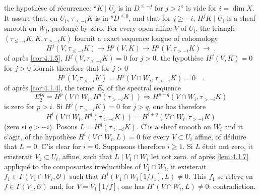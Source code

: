 \documentclass[12pt,a4paper]{article}
\theoremstyle{plain}
\theoremstyle{definition}
\newcommand{\cO}{\mathcal{O}}
\providecommand{\cO}{\mathcal{O}}
\begin{document}
the hypoth\`{e}se of r\'{e}currence: ``$K \mid U_{j}$ is in $D^{\leq -j}$ for $j > i$'' is vide for $i = \dim X$. It assure that, on $U_{i}$, $\tau_{\leq -i}K$ is in ${}^{p}D^{\leq 0}$, and that for $j \geq -i$, $H^{j}K \mid U_{i}$ is a sheaf smooth on $W_{i}$, prolong\'{e} by z\'{e}ro. For every open affine $V$ of $U_{i}$, the triangle $(\tau_{\leq -i}K, K, \tau_{> -i}K)$ fournit a exact sequence longue of cohomology
\[
H^{j}(V, \tau_{\leq -i}K) \longrightarrow H^{j}(V,K) \longrightarrow H^{j}(V, \tau_{> -i}K) \longrightarrow\;.
\]
of apr\`{e}s \ref{cor:4.1.5}, $H^{j}(V, \tau_{\leq -i}K) = 0$ for $j > 0$. the hypoth\`{e}se $H^{j}(V,K) = 0$ for $j > 0$ fournit therefore that for $j > 0$
\[
H^{j}(V, \tau_{> -i}K) = H^{j}(V \cap W_{i}, \tau_{> -i}K) = 0\quad.
\]
of apr\`{e}s \ref{cor:4.1.4}, the terme $E_{2}$ of the spectral sequence
\[
E_{2}^{pq} = H^{p}(V \cap W_{i}, H^{q}(\tau_{> -i}K)) \Rightarrow H^{p+q}(V \cap W_{i}, \tau_{> -i}K)
\]
is zero for $p > i$. Si $H^{j}(\tau_{> -i}K) = 0$ for $j > q$, one has therefore
\[
H^{i}(V \cap W_{i}, H^{q}(\tau_{> -i}K)) = H^{i+q}(V \cap W_{i}, \tau_{> -i}K)
\]
(zero si $q > -i$). Posons $L = H^{q}(\tau_{> -i}K)$. C'is a sheaf smooth on $W_{i}$ and it s'agit, of the hypoth\`{e}se $H^{i}(V \cap W_{i}, L) = 0$ for every $V \subset U_{i}$ affine, of d\'{e}duire that $L = 0$. C'is clear for $i = 0$. Supposons therefore $i \geq 1$. Si $L$ \'{e}tait not zero, it existerait $V_{1} \subset U_{i}$, affine, such that $L \mid V_{1} \cap W_{i}$ let not zero. of apr\`{e}s \ref{lem:4.1.7} appliqu\'{e} to the composantes irr\'{e}ductibles of $V_{1} \cap W_{i}$, it existerait $f_{1} \in \Gamma(V_{1} \cap W_{i}, \cO)$ such that $H^{i}(V_{1} \cap W_{i}[1/f_{1}], L) \neq 0$. This $f_{1}$ se rel\`{e}ve en $f \in \Gamma(V_{1}, \cO)$ and, for $V = V_{1}[1/f]$, one has $H^{i}(V \cap W_{i}, L) \neq 0$: contradiction.
\end{document}
